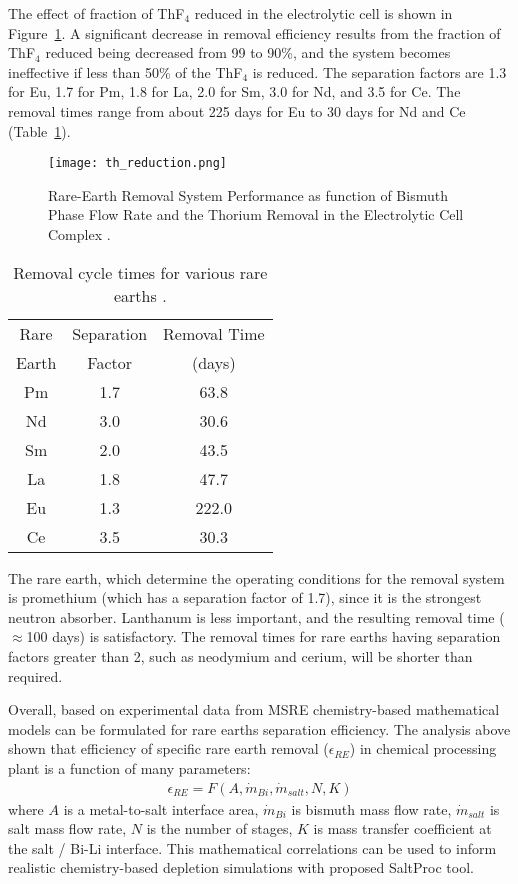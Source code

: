 The effect of fraction of ThF$_4$ reduced in the electrolytic cell is shown in Figure~\ref{fig:th-reduction}. A significant decrease in removal efficiency results from the fraction of ThF$_4$ reduced being decreased from 99 to 90\%, and the system becomes ineffective if less than 50\% of the ThF$_4$ is reduced.  The separation factors are 1.3 for Eu, 1.7 for Pm, 1.8 for La, 2.0 for Sm, 3.0 for Nd, and 3.5 for Ce. The removal times range from about 225 days for Eu to 30 days for Nd and Ce (Table~\ref{tab:removal_time}). 
\begin{figure}[htbp!]
  \centering
        \texttt{[image: th\_reduction.png]}
    \caption{Rare-Earth Removal System Performance as function of Bismuth Phase Flow Rate and the Thorium Removal in the Electrolytic Cell Complex \cite{briggs_molten-salt_1969}.}
    \label{fig:th-reduction}
\end{figure}
\begin{table}[ht!]
\caption{Removal cycle times for various rare earths \cite{briggs_molten-salt_1969}.}
  \centering
\begin{tabular}{c c c}
\hline Rare  & Separation & Removal Time                        \\
       Earth & Factor     & (days)								\\
\hline Pm          & 1.7				& 63.8 					\\
\hline Nd		   & 3.0                & 30.6 					\\
\hline Sm		   & 2.0                & 43.5 					\\
\hline La		   & 1.8                & 47.7 					\\
\hline Eu		   & 1.3                & 222.0 				\\
\hline Ce		   & 3.5                & 30.3 					\\
\hline 
\end{tabular}
  		\label{tab:removal_time}
\end{table}

The rare earth, which determine the operating conditions for the removal system is promethium (which has a separation factor of 1.7), since it is the strongest neutron absorber. Lanthanum is less important, and the resulting removal time ($\approx$100 days) is satisfactory.
The removal times for rare earths having separation factors greater than 2, such 
as neodymium and cerium, will be shorter than required.

Overall, based on experimental data from \gls{MSRE} chemistry-based mathematical 
models can be formulated for rare earths separation efficiency. The analysis above 
shown that efficiency of specific rare earth removal ($\epsilon_{RE}$) in chemical 
processing plant is a function of many parameters:
\begin{align}
\epsilon_{RE} = F (A, \dot{m}_{Bi}, \dot{m}_{salt}, N, K)
\end{align} 
where $A$ is a metal-to-salt interface area, $\dot{m}_{Bi}$ is bismuth mass 
flow rate, $\dot{m}_{salt}$ is salt mass flow rate, $N$ is the number of stages, 
$K$ is mass transfer coefficient at the salt / Bi-Li interface. 
This mathematical correlations can be used to inform realistic chemistry-based 
depletion simulations with proposed SaltProc tool.

